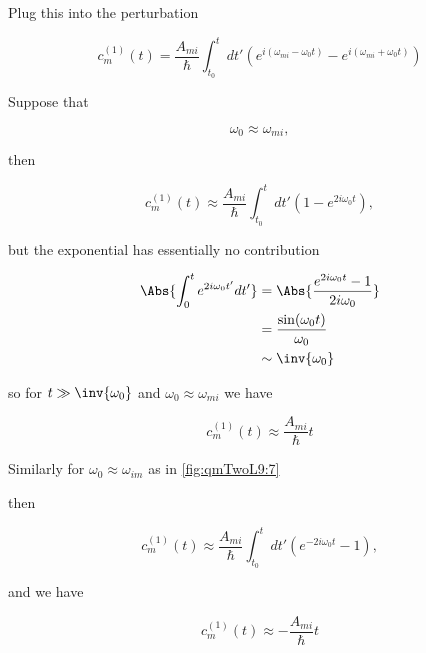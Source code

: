 {Plug this into the perturbation

\begin{equation}\label{eqn:qmTwoL9:510}
c_m^{(1)}(t) = 
\frac{A_{mi}}{\hbar} \int_{t_0}^t dt' 
\left( 
e^{i (\omega_{mi} - \omega_0 t) }
-e^{i (\omega_{mi} + \omega_0 t) }
\right)
\end{equation}


Suppose that

\begin{equation}\label{eqn:qmTwoL9:530}
\omega_0 \approx \omega_{mi},
\end{equation}

then

\begin{equation}\label{eqn:qmTwoL9:550}
c_m^{(1)}(t) \approx
\frac{A_{mi}}{\hbar} \int_{t_0}^t dt' 
\left( 
1
-e^{2 i \omega_0 t }
\right),
\end{equation}

but the exponential has essentially no contribution

\begin{align*}
\Abs{\int_0^t e^{2 i \omega_0 t'} dt' } 
&= 
\Abs{\frac{e^{2 i \omega_0 t} -1 }{2 i \omega_0}}  \\
&= 
\frac{\sin(\omega_0 t)}{\omega_0} \\
&\sim \inv{\omega_0}
\end{align*}

so for $t \gg \inv{\omega_0}$ and $\omega_0 \approx \omega_{mi}$ we have 

\begin{equation}\label{eqn:qmTwoL9:570}
c_m^{(1)}(t) \approx \frac{A_{mi}}{\hbar} t
\end{equation}

Similarly for $\omega_0 \approx \omega_{im}$ as in \cref{fig:qmTwoL9:7} 


then

\begin{equation}\label{eqn:qmTwoL9:590}
c_m^{(1)}(t) \approx
\frac{A_{mi}}{\hbar} \int_{t_0}^t dt' 
\left( 
e^{-2 i \omega_0 t }
-1
\right),
\end{equation}

and we have

\begin{equation}\label{eqn:qmTwoL9:610}
c_m^{(1)}(t) \approx -\frac{A_{mi}}{\hbar} t
\end{equation}
}

\shipoutAnswer
